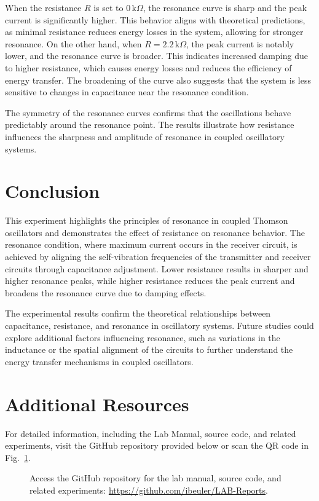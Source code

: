 \documentclass[journal]{IEEEtran}
\begin{document}
When the resistance \( R \) is set to \( 0 \, \text{k}\Omega \), the resonance curve is sharp and the peak current is significantly higher. This behavior aligns with theoretical predictions, as minimal resistance reduces energy losses in the system, allowing for stronger resonance. On the other hand, when \( R = 2.2 \, \text{k}\Omega \), the peak current is notably lower, and the resonance curve is broader. This indicates increased damping due to higher resistance, which causes energy losses and reduces the efficiency of energy transfer. The broadening of the curve also suggests that the system is less sensitive to changes in capacitance near the resonance condition.

The symmetry of the resonance curves confirms that the oscillations behave predictably around the resonance point. The results illustrate how resistance influences the sharpness and amplitude of resonance in coupled oscillatory systems.

\section{Conclusion}
This experiment highlights the principles of resonance in coupled Thomson oscillators and demonstrates the effect of resistance on resonance behavior. The resonance condition, where maximum current occurs in the receiver circuit, is achieved by aligning the self-vibration frequencies of the transmitter and receiver circuits through capacitance adjustment. Lower resistance results in sharper and higher resonance peaks, while higher resistance reduces the peak current and broadens the resonance curve due to damping effects.

The experimental results confirm the theoretical relationships between capacitance, resistance, and resonance in oscillatory systems. Future studies could explore additional factors influencing resonance, such as variations in the inductance or the spatial alignment of the circuits to further understand the energy transfer mechanisms in coupled oscillators.

\section{Additional Resources}
For detailed information, including the Lab Manual, source code, and related experiments, visit the GitHub repository provided below or scan the QR code in Fig.~\ref{fig:qr_code}.

\begin{figure}[H]
    
    \centering
    \begin{minipage}{0.15\textwidth}
        \centering
    \end{minipage}%
    \begin{minipage}{0.2\textwidth}
        \raggedright
        \caption{Access the GitHub repository for the lab manual, source code, and related experiments: \href{https://github.com/ibeuler/LAB-Reports}{\url{https://github.com/ibeuler/LAB-Reports}}.}
        \label{fig:qr_code}
    \end{minipage}
\end{figure}
\end{document}
